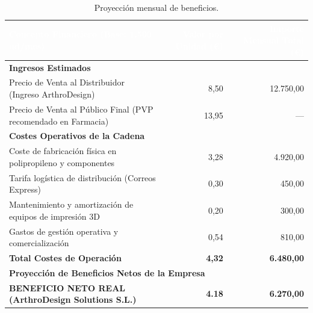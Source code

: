 \documentclass[11pt,a4paper]{article}
\begin{document}
\begin{table}[H]
\centering
\renewcommand{\arraystretch}{1.3}
\begin{tabularx}{\textwidth}{|X|r|r|}
\hline
\rowcolor{ArthroTeal}
\textcolor{white}{\textbf{Concepto Financiero (Base: 1.500 ud/mes)}} & \textcolor{white}{\textbf{Valor por Unidad (€)}} & \textcolor{white}{\textbf{Importe Mensual Total (€)}} \\
\hline
\multicolumn{3}{|l|}{\cellcolor{ArthroNavy!10}\textbf{Ingresos Estimados}} \\
\hline
Precio de Venta al Distribuidor (Ingreso ArthroDesign) & 8,50 & 12.750,00 \\
\hline
Precio de Venta al Público Final (PVP recomendado en Farmacia) & 13,95 & --- \\
\hline
\multicolumn{3}{|l|}{\cellcolor{ArthroNavy!10}\textbf{Costes Operativos de la Cadena}} \\
\hline
Coste de fabricación física en polipropileno y componentes & 3,28 & 4.920,00 \\
\hline
Tarifa logística de distribución (Correos Express) & 0,30 & 450,00 \\
\hline
Mantenimiento y amortización de equipos de impresión 3D & 0,20 & 300,00 \\
\hline
Gastos de gestión operativa y comercialización & 0,54 & 810,00 \\
\hline
\rowcolor{ArthroGray!20}
\textbf{Total Costes de Operación} & \textbf{4,32} & \textbf{6.480,00} \\
\hline
\multicolumn{3}{|l|}{\cellcolor{ArthroNavy!10}\textbf{Proyección de Beneficios Netos de la Empresa}} \\
\hline
\rowcolor{ArthroTeal!20}
\textbf{BENEFICIO NETO REAL (ArthroDesign Solutions S.L.)} & \textbf{4.18} & \textbf{6.270,00} \\
\hline
\end{tabularx}
\caption{Proyección mensual de beneficios.}
\label{tab:proyeccion-beneficios}
\end{table}
\end{document}
